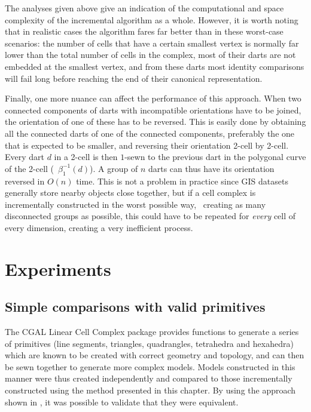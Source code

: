 The analyses given above give an indication of the computational and space complexity of the incremental algorithm as a whole.
However, it is worth noting that in realistic cases the algorithm fares far better than in these worst-case scenarios: the number of cells that have a certain smallest vertex is normally far lower than the total number of cells in the complex, most of their darts are not embedded at the smallest vertex, and from these darts most identity comparisons will fail long before reaching the end of their canonical representation.

Finally, one more nuance can affect the performance of this approach.
When two connected components of darts with incompatible orientations have to be joined, the orientation of one of these has to be reversed.
This is easily done by obtaining all the connected darts of one of the connected components, preferably the one that is expected to be smaller, and reversing their orientation 2-cell by 2-cell.
Every dart $d$ in a 2-cell is then $1$-sewn to the previous dart in the polygonal curve of the 2-cell (\ie\ $\beta_{1}^{-1}(d)$).
A group of $n$ darts can thus have its orientation reversed in $O(n)$ time.
This is not a problem in practice since GIS datasets generally store nearby objects close together, but if a cell complex is incrementally constructed in the worst possible way, \ie\ creating as many disconnected groups as possible, this could have to be repeated for \emph{every} cell of every dimension, creating a very inefficient process.

\section{Experiments}
\label{se:incremental-experiments}

\subsection*{Simple comparisons with valid primitives}

The CGAL Linear Cell Complex package provides functions to generate a series of primitives (line segments, triangles, quadrangles, tetrahedra and hexahedra) which are known to be created with correct geometry and topology, and can then be sewn together to generate more complex models.
Models constructed in this manner were thus created independently and compared to those incrementally constructed using the method presented in this chapter.
By using the approach shown in , it was possible to validate that they were equivalent.

